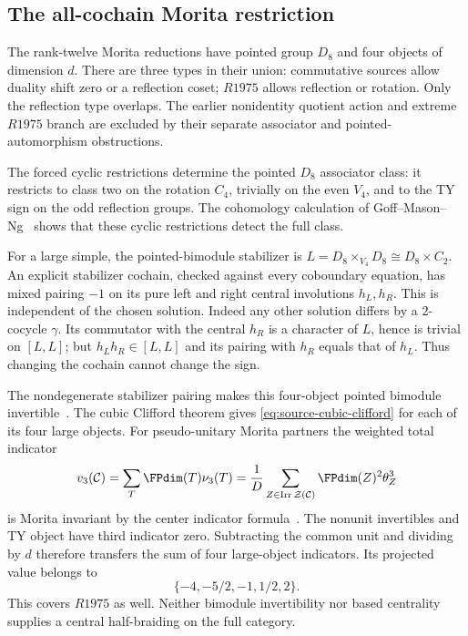 \subsection{The all-cochain Morita restriction}
The rank-twelve Morita reductions have pointed group $D_8$ and four
objects of dimension $d$. There are three types in their union:
commutative sources allow duality shift zero or a reflection coset;
$R1975$ allows reflection or rotation. Only the reflection type overlaps.
The earlier nonidentity quotient action and extreme $R1975$ branch
are excluded by their separate associator and pointed-automorphism
obstructions.

The forced cyclic restrictions determine the pointed $D_8$ associator
class: it restricts to class two on the rotation $C_4$, trivially on
the even $V_4$, and to the TY sign on the odd reflection groups.
The cohomology calculation of Goff--Mason--Ng~\cite[Lemmas 4.4--4.5]{RetryGMN}
shows that these cyclic restrictions detect the full class.

For a large simple, the pointed-bimodule stabilizer is
$L=D_8\times_{V_4}D_8\cong D_8\times C_2$. An explicit stabilizer
cochain, checked against every coboundary equation, has mixed pairing
$-1$ on its pure left and right central involutions $h_L,h_R$.
This is independent of the chosen solution. Indeed any other solution
differs by a $2$-cocycle $\gamma$. Its commutator with the central
$h_R$ is a character of $L$, hence is trivial on $[L,L]$; but
$h_Lh_R\in[L,L]$ and its pairing with $h_R$ equals that of $h_L$.
Thus changing the cochain cannot change the sign.

The nondegenerate stabilizer pairing makes this four-object pointed
bimodule invertible~\cite[Proposition 2.7]{RetryVV}. The cubic Clifford theorem gives
\eqref{eq:source-cubic-clifford} for each of its four large objects.
For pseudo-unitary Morita partners the weighted total indicator
\[
 v_3(\mathcal C)=\sum_T\FPdim(T)\nu_3(T)
 =\frac1D\sum_{Z\in\operatorname{Irr}\mathcal Z(\mathcal C)}
                 \FPdim(Z)^2\theta_Z^3
\]
is Morita invariant by the center indicator formula~\cite{RetryNS}. The nonunit invertibles and TY object have third
indicator zero. Subtracting the common unit and dividing by $d$
therefore transfers the sum of four large-object indicators. Its
projected value belongs to
\[
 \{-4,-5/2,-1,1/2,2\}.
\]
This covers $R1975$ as well. Neither bimodule invertibility nor
based centrality supplies a central half-braiding on the full category.

